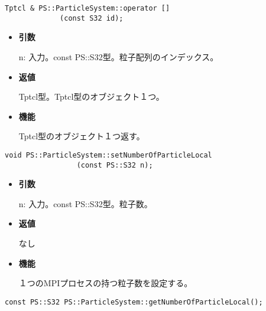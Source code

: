 
\begin{screen}
\begin{verbatim}
Tptcl & PS::ParticleSystem::operator []
             (const S32 id);
\end{verbatim}
\end{screen}

\begin{itemize}

\item {\bf 引数}

n: 入力。const PS::S32型。粒子配列のインデックス。

\item {\bf 返値}

Tptcl型。Tptcl型のオブジェクト１つ。

\item {\bf 機能}

Tptcl型のオブジェクト１つ返す。

\end{itemize}


\begin{screen}
\begin{verbatim}
void PS::ParticleSystem::setNumberOfParticleLocal
                 (const PS::S32 n);
\end{verbatim}
\end{screen}

\begin{itemize}

\item {\bf 引数}

n: 入力。const PS::S32型。粒子数。

\item {\bf 返値}

なし

\item {\bf 機能}

１つのMPIプロセスの持つ粒子数を設定する。

\end{itemize}


\begin{screen}
\begin{verbatim}
const PS::S32 PS::ParticleSystem::getNumberOfParticleLocal();
\end{verbatim}
\end{screen}

